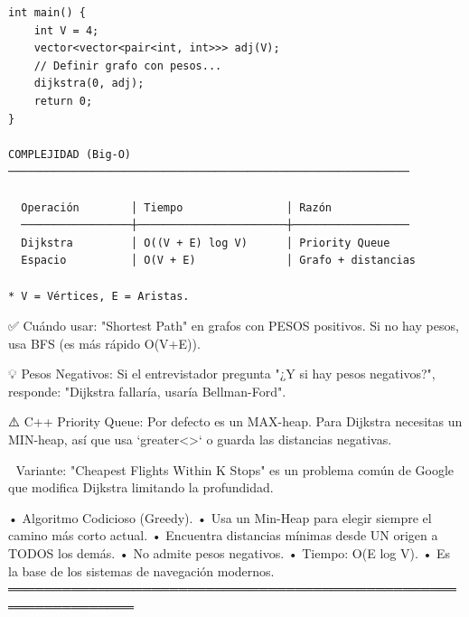 \begin{lstlisting}
int main() {
    int V = 4;
    vector<vector<pair<int, int>>> adj(V);
    // Definir grafo con pesos...
    dijkstra(0, adj);
    return 0;
}

COMPLEJIDAD (Big-O)
──────────────────────────────────────────────────────────────

  Operación        │ Tiempo                │ Razón
  ─────────────────┼───────────────────────┼──────────────────
  Dijkstra         │ O((V + E) log V)      │ Priority Queue
  Espacio          │ O(V + E)              │ Grafo + distancias

* V = Vértices, E = Aristas.
\end{lstlisting}

\begin{dsaentrevistas}

✅ Cuándo usar: "Shortest Path" en grafos con PESOS positivos. Si no
   hay pesos, usa BFS (es más rápido O(V+E)).

💡 Pesos Negativos: Si el entrevistador pregunta "¿Y si hay pesos
   negativos?", responde: "Dijkstra fallaría, usaría Bellman-Ford".

⚠️ C++ Priority Queue: Por defecto es un MAX-heap. Para Dijkstra 
   necesitas un MIN-heap, así que usa `greater<>` o guarda las 
   distancias negativas.

🔑 Variante: "Cheapest Flights Within K Stops" es un problema común 
   de Google que modifica Dijkstra limitando la profundidad.

\end{dsaentrevistas}

\begin{dsaresumen}

• Algoritmo Codicioso (Greedy).
• Usa un Min-Heap para elegir siempre el camino más corto actual.
• Encuentra distancias mínimas desde UN origen a TODOS los demás.
• No admite pesos negativos.
• Tiempo: O(E log V).
• Es la base de los sistemas de navegación modernos.
════════════════════════════════════════════════════════════════

\end{dsaresumen}


